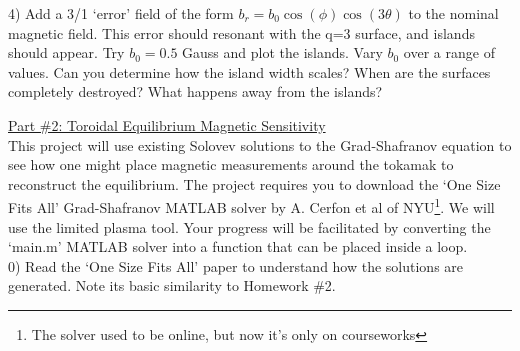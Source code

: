 \documentclass[letterpaper,12pt]{article}
\begin{document}
4) Add a 3/1 `error' field of the form $b_r=b_0\cos{(\phi{})}\cos{(3\theta)}$ to the nominal magnetic field. This error should resonant with the q=3 surface, and islands should appear. Try $b_0=0.5$ Gauss and plot the islands. Vary $b_0$ over a range of values. Can you determine how the island width scales? When are the surfaces completely destroyed? What happens away from the islands?

\newpage
\clearpage

\underline{Part \#2: Toroidal Equilibrium Magnetic Sensitivity}\\

This project will use existing Solovev solutions to the Grad-Shafranov equation to see how one might place magnetic measurements around the tokamak to reconstruct the equilibrium. The project requires you to download the `One Size Fits All' Grad-Shafranov MATLAB solver by A. Cerfon et al of NYU\footnote{The solver used to be online, but now it's only on courseworks}. We will use the limited plasma tool. Your progress will be facilitated by converting the `main.m' MATLAB solver into a function that can be placed inside a loop. \\

0) Read the `One Size Fits All' paper to understand how the solutions are generated. Note its basic similarity to Homework \#2.\\
\end{document}
